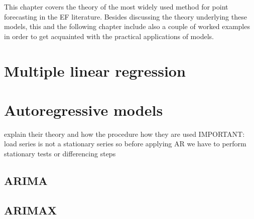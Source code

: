 This chapter covers the theory of the most widely used method for point forecasting in the EF literature. Besides discussing the theory underlying these models, this and the following chapter include also a couple of worked examples in order to get acquainted with the practical applications of models.




\section{Multiple linear regression}

\section{Autoregressive models}
explain their theory
and how the procedure how they are used
IMPORTANT: load series is not a stationary series so before applying AR we have to perform stationary tests or differencing steps
\subsection{ARIMA}
\subsection{ARIMAX}
